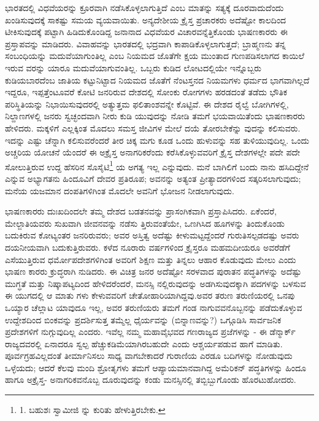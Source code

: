 ಭಾರತದಲ್ಲಿ ವಿಧವೆಯರನ್ನು ಕ್ರೂರವಾಗಿ ನಡೆಸಿಕೊಳ್ಳಲಾಗುತ್ತಿದೆ ಎಂಬ ಮಾತನ್ನು ಸತ್ಯಕ್ಕೆ ದೂರವಾದುದೆಂದು ಖಂಡಿಸುವುದಕ್ಕೆ ಸಾಕಷ್ಟು ಸಮಯ ವ್ಯಯವಾಯಿತು. ಅನ್ಯದೇಶೀಯ ಕ್ರೈಸ್ತ ಪ್ರಚಾರಕರು ಅದೆಷ್ಟೋ ಕಾಲದಿಂದ ಟೀಕಿಸುವುದಕ್ಕೆ ಪಟ್ಟಾಗಿ ಹಿಡಿದುಕೊಂಡಿದ್ದ ಜನಾನಾದ ವಿಧವೆಯರ ವಿಚಾರವನ್ನೆತ್ತಿಕೊಂಡು ಭಾಷಣಕಾರರು ಈ ಪ್ರಸ್ತಾಪವನ್ನು ಮಾಡಿದರು. ವಿವಾಹವನ್ನು ಭಾರತದಲ್ಲಿ ಭದ್ರವಾಗಿ ಕಾಪಾಡಿಕೊಳ್ಳಲಾಗುತ್ತದೆ; ಬ್ರಾಹ್ಮಣನು ತನ್ನ ಸಂಬಂಧಿಯನ್ನು ಮದುವೆಯಾಗುಂತಿಲ್ಲ ಎಂಬ ನಿಯಮದ ಜೊತೆಗೇ ಕ್ಷಯ ಮುಂತಾದ ಗುಣಪಡಿಸಲಾಗದ ಕಾಯಿಲೆ ಇರುವ ವರನ್ನು ಯಾರೂ ಮದುವೆಯಾಗುವಂತಿಲ್ಲ. ಒಬ್ಬರು ಕುಡಿದ ಲೋಟದಲ್ಲಿಯೇ ಇನ್ನೊಬ್ಬರು ಕುಡಿಯಬಾರದೆಂಬ ಜಾತಿಯ ಕಟ್ಟುನಿಟ್ಟಾದ ನಿಯಮದ ಜೊತೆಗೆ ನೆಂಟಸ್ತನದ ನಿಯಮಗಳು ಧರ್ಮದ ಭಾಗವಾಗಿಲ್ಲದೆ ಇದ್ದರೂ, ಇಪ್ಪತ್ತೆಂಟೂವರೆ ಕೋಟಿ ಜನರಿರುವ ದೇಶದಲ್ಲಿ ಸೋಂಕು ರೋಗಗಳು ಹರಡದಂತೆ ತಡೆದು ಭೌತಿಕ ಪರಿಸ್ಥಿತಿಯನ್ನು ನಿಭಾಯಿಸುವುದರಲ್ಲಿ ಅತ್ಯುತ್ತಮ ಫಲಿತಾಂಶವನ್ನೇ ಕೊಟ್ಟಿವೆ. ಈ ದೇಶದ ರೈಲ್ವೆ ಬೋಗಿಗಳಲ್ಲಿ, ನಿಲ್ದಾಣಗಳಲ್ಲಿ ಜನರು ಸ್ವಚ್ಛಂದವಾಗಿ ನೀರು ಕುಡಿ ಯುವುದನ್ನು ನೋಡಿ ತಮಗೆ ಭಯವಾಯಿತೆಂದು ಭಾಷಣಕಾರರು ಹೇಳಿದರು. ಮಕ್ಕಳಿಗೆ ಎಲ್ಲಕ್ಕಿಂತ ಮೊದಲು ಸಮಸ್ತ ಜೀವಿಗಳ ಮೇಲೆ ದಯೆ ತೋರಬೇಕೆನ್ನು ವುದನ್ನು ಕಲಿಸುವರು. ಇದನ್ನು ಎಷ್ಟು ಚೆನ್ನಾಗಿ ಕಲಿಸುವರೆಂದರೆ ತೀರ ಚಿಕ್ಕ ಮಗು ಕೂಡ ಒಂದು ಹುಳುವನ್ನು ಸಹ ತುಳಿಯುವುದಿಲ್ಲ. ಒಂದು ಅಚ್ಚರಿಯ ಯೋಚನೆ ಯೆಂದರೆ ಈ ಅಕ್ರೈಸ್ತ ಅನಾಗರಿಕರೆಂದು ಕರೆಸಿಕೊಳ್ಳುವವರಿಗೆ ಕ್ರೈಸ್ತ ದೇಶಗಳಲ್ಲೇ ಪದೇ ಪದೇ ಸೋಲುತ್ತಿರುವ ಉದ್ದ ಹೆಸರಿನ ಸೊಸೈಟಿ\footnote{1. ಬಹುಶಃ ಸ್ವಾಮೀಜಿ  ನ್ನು ಕುರಿತು ಹೇಳುತ್ತಿರಬೇಕು.} ಯ ಅಗತ್ಯ ಇಲ್ಲ ಎನ್ನುವುದು. ಮನೆ ಬಾಗಿಲಿಗೆ ಬಂದು ನಾನು ಹಸಿದಿದ್ದೇನೆ ಎನ್ನುವ ಅಭ್ಯಾಗತನು ಹಿಂದೂವಿಗೆ ದೇವರ ಪ್ರತಿರೂಪ; ಅವನನ್ನು ಅತ್ಯಂತ ಪ್ರೀತ್ಯಾದರಗಳಿಂದ ಸತ್ಕರಿಸಲಾಗುವುದು; ಮನೆಯ ಯಜಮಾನ ದಂಪತಿಗಳಿಗಿಂತ ಮೊದಲೇ ಅವನಿಗೆ ಭೋಜನ ನೀಡಲಾಗುವುದು.

ಭಾಷಣಕಾರರು ದುಃಖದಿಂದಲೇ ತಮ್ಮ ದೇಶದ ಬಡತನವನ್ನು ಪ್ರಾಸಂಗಿಕವಾಗಿ ಪ್ರಸ್ತಾಪಿಸಿದರು. ಏಕೆಂದರೆ, ಮೇಲ್ಜಾತಿಯವರು ಸುಖವಾಗಿ ಜೀವನವನ್ನು ನಡೆಸು ತ್ತಿರುವಂತೆಯೇ, ಒಣಗಿಸಿದ ಹೂಗಳನ್ನು ತಿಂದುಕೊಂಡು ಬದುಕಿರುವ ಕೋಟ್ಯಂತರ ಜನರಿರುವರು; ಅವರ ಅಸ್ತಿತ್ವ ಅದೆಷ್ಟು ಕೀಳುಮಟ್ಟದ್ದೆಂದರೆ ಗುರುತಿಸಲ್ಪಡದಷ್ಟು ಅವರು ದಯನೀಯವಾಗಿ ಬದುಕುತ್ತಿರುವರು. ಕಳೆದ ನೂರಾರು ವರ್ಷಗಳಿಂದ ಕ್ರೈಸ್ತರೂ ಮಹಮದೀಯರೂ ಅವರೆಡೆಗೆ ಎಸೆಯುತ್ತಿರುವ ಧರ್ಮೋಪದೇಶಗಳಿಗಿಂತ ಅವರಿಗೆ ಶಿಕ್ಷಣ ಮತ್ತು ತಿನ್ನಲು ಆಹಾರ ಕೊಡುವುದು ಮೇಲು ಎಂದು ಭಾಷಣ ಕಾರರು ಕ್ರುದ್ಧರಾಗಿ ನುಡಿದರು. ಈ ವಿಚಿತ್ರ ಜನರ ಅದೆಷ್ಟೋ ಸರಳವಾದ ಪುರಾತನ ಪದ್ಧತಿಗಳನ್ನು ಅದೆಷ್ಟು ಮುಗ್ಧತೆ ಮತ್ತು ನಿಷ್ಕಾಪಟ್ಯದಿಂದ ಹೇಳಿದರೆಂದರೆ, ಮನಸ್ಸಿ ನಲ್ಲಿರುವುದನ್ನು ಅಡಗಿಸುವುದಕ್ಕಾಗಿ ಪದಗಳನ್ನು ಬಳಸುವ ಈ ಯುಗದಲ್ಲಿ ಆ ಮಾತು ಗಳು ಕೇಳುವವರಿಗೆ ಚೇತೋಹಾರಿಯಾಗಿದ್ದವು.ಅವರ ತರುಣ ತರುಣಿಯರಲ್ಲಿ ಒನಪು ಒಯ್ಯಾರ ಚೆಲ್ಲಾಟ ಯಾವುದೂ ಇಲ್ಲ, ಅವರ ತರುಣಿಯರು ತಮಗೆ ಗಂಡ ನಾಗುವವನೊಬ್ಬನನ್ನು ಪಡೆದುಕೊಳ್ಳುವ ಉದ್ದೇಶದಿಂದ ಬಿಂಕವನ್ನು ಪ್ರದರ್ಶಿಸುತ್ತ ತಮ್ಮೆಲ್ಲ ಧೈರ್ಯವನ್ನು (ಬಿನ್ನಾಣವನ್ನು?) ಒಗ್ಗೂಡಿಸಿ ಸಾರ್ವಜನಿಕ ಪ್ರದೇಶಗಳಿಗೆ ನುಗ್ಗುವುದಿಲ್ಲ ಎಂದರು. ಇವೆಲ್ಲ ನಮ್ಮ ಮಹಾವೈಭವದ ಗಣರಾಜ್ಯದ ಪ್ರಜೆಗಳನ್ನು - ಈ ಡೆನ್ಮಾರ್ಕ್ ರಾಜ್ಯದವರಲ್ಲಿ ಏನಾದರೂ ಸ್ವಲ್ಪ ಹೆಚ್ಚುಕಡಿಮೆಯಾಗಿರಬಹುದೇ ಎಂದು ಆಶ್ಚರ್ಯಪಡುವ ಹಾಗೆ ಮಾಡಿತು. ಪೂರ್ವಗ್ರಹವಿಲ್ಲದಂತೆ ತೀರ್ಮಾನಿಸಲು ಸಾಧ್ಯ ವಾಗಬೇಕಾದರೆ ಗುರಾಣಿಯ ಎರಡೂ ಬದಿಗಳನ್ನು ನೋಡುವುದು ಒಳ್ಳೆಯದು; ಆದರೆ ಕೆಲವು ಮಂದಿ ಶ್ರೋತೃಗಳು ತಮಗೆ ಆಪ್ಯಾಯಮಾನವಾಗಿದ್ದ ಅಮೆರಿಕನ್ ಪದ್ಧತಿಗಳನ್ನು ಹಿಂದೂ ಹಾಗೂ ಅಕ್ರೈಸ್ತ- ಅನಾಗರಿಕವನೊಬ್ಬ ದೂರುವುದನ್ನು ಕಂಡು ಮನಸ್ಸಿನಲ್ಲಿ ತಬ್ಬಿಬ್ಬುಗೊಂಡು ಹೊರಟುಹೋದರು.

